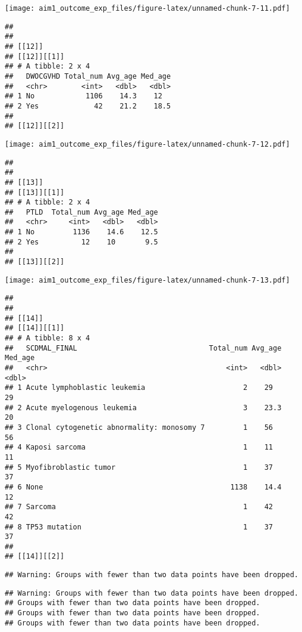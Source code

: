 \documentclass[
]{article}
\begin{document}
\texttt{[image: aim1\_outcome\_exp\_files/figure-latex/unnamed-chunk-7-11.pdf]}

\begin{verbatim}
## 
## 
## [[12]]
## [[12]][[1]]
## # A tibble: 2 x 4
##   DWOCGVHD Total_num Avg_age Med_age
##   <chr>        <int>   <dbl>   <dbl>
## 1 No            1106    14.3    12  
## 2 Yes             42    21.2    18.5
## 
## [[12]][[2]]
\end{verbatim}

\texttt{[image: aim1\_outcome\_exp\_files/figure-latex/unnamed-chunk-7-12.pdf]}

\begin{verbatim}
## 
## 
## [[13]]
## [[13]][[1]]
## # A tibble: 2 x 4
##   PTLD  Total_num Avg_age Med_age
##   <chr>     <int>   <dbl>   <dbl>
## 1 No         1136    14.6    12.5
## 2 Yes          12    10       9.5
## 
## [[13]][[2]]
\end{verbatim}

\texttt{[image: aim1\_outcome\_exp\_files/figure-latex/unnamed-chunk-7-13.pdf]}

\begin{verbatim}
## 
## 
## [[14]]
## [[14]][[1]]
## # A tibble: 8 x 4
##   SCDMAL_FINAL                               Total_num Avg_age Med_age
##   <chr>                                          <int>   <dbl>   <dbl>
## 1 Acute lymphoblastic leukemia                       2    29        29
## 2 Acute myelogenous leukemia                         3    23.3      20
## 3 Clonal cytogenetic abnormality: monosomy 7         1    56        56
## 4 Kaposi sarcoma                                     1    11        11
## 5 Myofibroblastic tumor                              1    37        37
## 6 None                                            1138    14.4      12
## 7 Sarcoma                                            1    42        42
## 8 TP53 mutation                                      1    37        37
## 
## [[14]][[2]]
\end{verbatim}

\begin{verbatim}
## Warning: Groups with fewer than two data points have been dropped.
\end{verbatim}

\begin{verbatim}
## Warning: Groups with fewer than two data points have been dropped.
## Groups with fewer than two data points have been dropped.
## Groups with fewer than two data points have been dropped.
## Groups with fewer than two data points have been dropped.
\end{verbatim}
\end{document}
